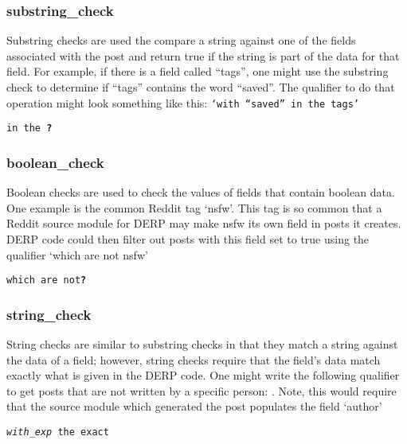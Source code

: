 \subsubsection{substring\_check}
Substring checks are used the compare a string against one of the fields associated with the post and return true if the string is part
of the data for that field. For example, if there is a field called “tags”, one might use the substring check to determine if “tags”
contains the word “saved”. The qualifier to do that operation might look something like this: \texttt{‘with “saved” in the tags’}
\begin{description}[labelindent=1cm,leftmargin=\onelen,labelwidth=1cm]
     
     \texttt{in the \textbf{?}}
\end{description}

\subsubsection{boolean\_check}
Boolean checks are used to check the values of fields that contain boolean data. One example is the common Reddit tag ‘nsfw’. This tag
is so common that a Reddit source module for DERP may make nsfw its own field in posts it creates. DERP code could then filter out posts
with this field set to true using the qualifier ‘which are not nsfw’
\begin{description}[labelindent=1cm,leftmargin=\onelen,labelwidth=1cm]
          
          \texttt{which are not\textbf{?}}
\end{description}

\subsubsection{string\_check}
String checks are similar to substring checks in that they match a string against the data of a field; however, string checks require
that the field’s data match exactly what is given in the DERP code. One might write the following qualifier to get posts that are not
written by a specific person: . Note, this would require that the source module which
generated the post populates the field ‘author’
\begin{description}[labelindent=1cm,leftmargin=\onelen,labelwidth=1cm]
            
            \texttt{\textit{with\_exp} the exact}
\end{description}




